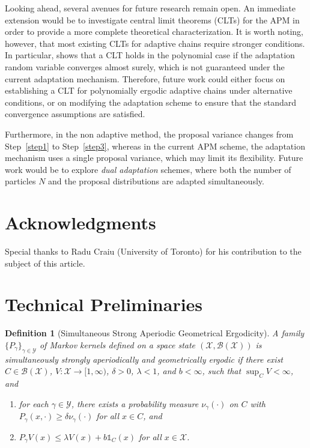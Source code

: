 \documentclass[pdflatex,sn-mathphys-num]{sn-jnl}
\newcommand{\ind}{\mathds{1}}
\renewcommand{\geq}{\geqslant}
\renewcommand{\leq}{\leqslant}
\theoremstyle{thmstyleone}
\theoremstyle{thmstyletwo}
\theoremstyle{thmstylethree}
\newtheorem{definition}{Definition}
\begin{document}
Looking ahead, several avenues for future research remain open. An immediate extension would be to investigate central limit theorems (CLTs) for the APM in order to provide a more complete theoretical characterization. 
It is worth noting, however, that most existing CLTs for adaptive chains require stronger conditions. In particular, \cite{atchade_2012} shows that a CLT holds in the polynomial case if the adaptation random variable converges almost surely, which is not guaranteed under the current adaptation mechanism. Therefore, future work could either focus on establishing a CLT for polynomially ergodic adaptive chains under alternative conditions, or on modifying the adaptation scheme to ensure that the standard convergence assumptions are satisfied.  

Furthermore, in the non adaptive method, the proposal variance changes from Step~\ref{step1} to Step~\ref{step3}, whereas in the current APM scheme, the adaptation mechanism uses a single proposal variance, which may limit its flexibility. Future work would be to explore \textit{dual adaptation} schemes, where both the number of particles $N$ and the proposal distributions are adapted simultaneously.

\section*{Acknowledgments}
Special thanks to Radu Craiu (University of Toronto) for his contribution to the subject of this article.

%


\appendix
\section{Technical Preliminaries}
\label{appendixA}
\begin{definition}[Simultaneous Strong Aperiodic Geometrical Ergodicity]  
A family $\{P_\gamma\}_{\gamma \in \mathcal{Y}}$ of Markov kernels defined on a space state $(\mathcal{X}, \mathcal{B}(\mathcal{X}))$ is \textit{simultaneously strongly aperiodically and geometrically ergodic} if there exist $C \in \mathcal{B}(\mathcal{X})$, $V: \mathcal{X} \to [1,\infty)$, $\delta > 0$, $\lambda < 1$, and $b < \infty$, such that $\sup_C V < \infty$, and

\begin{enumerate}
    \item[(i)] for each $\gamma \in \mathcal{Y}$, there exists a probability measure $\nu_\gamma(\cdot)$ on $C$ with $P_\gamma(x,\cdot) \geq \delta\nu_\gamma(\cdot)$ for all $x \in C$, and
    
    \item[(ii)] $P_\gamma V(x) \leq \lambda V(x) + b \ind_C(x)$ for all $x \in \mathcal{X}$.
\end{enumerate}
\label{def2}
\end{definition}
\end{document}

